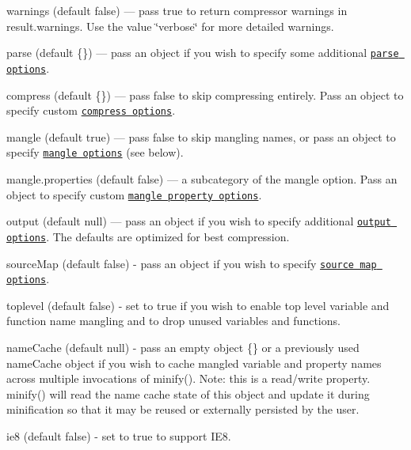 \begin{DoxyItemize}
\item {\ttfamily warnings} (default {\ttfamily false}) — pass {\ttfamily true} to return compressor warnings in {\ttfamily result.\+warnings}. Use the value {\ttfamily \char`\"{}verbose\char`\"{}} for more detailed warnings.
\item {\ttfamily parse} (default {\ttfamily \{\}}) — pass an object if you wish to specify some additional \href{#parse-options}{\tt parse options}.
\item {\ttfamily compress} (default {\ttfamily \{\}}) — pass {\ttfamily false} to skip compressing entirely. Pass an object to specify custom \href{#compress-options}{\tt compress options}.
\item {\ttfamily mangle} (default {\ttfamily true}) — pass {\ttfamily false} to skip mangling names, or pass an object to specify \href{#mangle-options}{\tt mangle options} (see below).
\begin{DoxyItemize}
\item {\ttfamily mangle.\+properties} (default {\ttfamily false}) — a subcategory of the mangle option. Pass an object to specify custom \href{#mangle-properties-options}{\tt mangle property options}.
\end{DoxyItemize}
\item {\ttfamily output} (default {\ttfamily null}) — pass an object if you wish to specify additional \href{#output-options}{\tt output options}. The defaults are optimized for best compression.
\item {\ttfamily source\+Map} (default {\ttfamily false}) -\/ pass an object if you wish to specify \href{#source-map-options}{\tt source map options}.
\item {\ttfamily toplevel} (default {\ttfamily false}) -\/ set to {\ttfamily true} if you wish to enable top level variable and function name mangling and to drop unused variables and functions.
\item {\ttfamily name\+Cache} (default {\ttfamily null}) -\/ pass an empty object {\ttfamily \{\}} or a previously used {\ttfamily name\+Cache} object if you wish to cache mangled variable and property names across multiple invocations of {\ttfamily minify()}. Note\+: this is a read/write property. {\ttfamily minify()} will read the name cache state of this object and update it during minification so that it may be reused or externally persisted by the user.
\item {\ttfamily ie8} (default {\ttfamily false}) -\/ set to {\ttfamily true} to support I\+E8.
\end{DoxyItemize}

